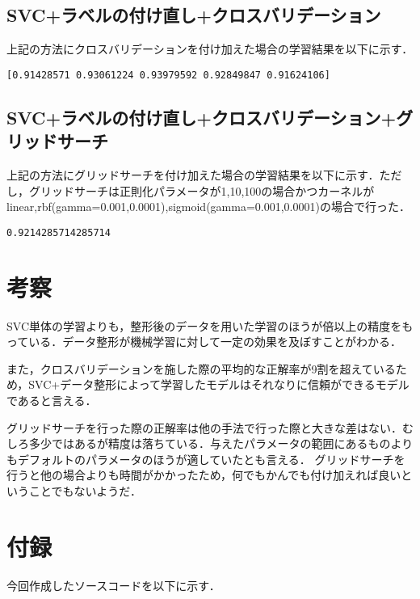 \documentclass[a4paper, titlepage]{jsarticle}
\begin{document}
	\subsection{SVC+ラベルの付け直し+クロスバリデーション}
	上記の方法にクロスバリデーションを付け加えた場合の学習結果を以下に示す．

	\begin{lstlisting}
[0.91428571 0.93061224 0.93979592 0.92849847 0.91624106]
	\end{lstlisting}

	\subsection{SVC+ラベルの付け直し+クロスバリデーション+グリッドサーチ}
	上記の方法にグリッドサーチを付け加えた場合の学習結果を以下に示す．ただし，グリッドサーチは正則化パラメータが1,10,100の場合かつカーネルがlinear,rbf(gamma=0.001,0.0001),sigmoid(gamma=0.001,0.0001)の場合で行った．

	\begin{lstlisting}
0.9214285714285714
	\end{lstlisting}

	\section{考察}
	SVC単体の学習よりも，整形後のデータを用いた学習のほうが倍以上の精度をもっている．データ整形が機械学習に対して一定の効果を及ぼすことがわかる．
	
	また，クロスバリデーションを施した際の平均的な正解率が9割を超えているため，SVC+データ整形によって学習したモデルはそれなりに信頼ができるモデルであると言える．

	グリッドサーチを行った際の正解率は他の手法で行った際と大きな差はない．むしろ多少ではあるが精度は落ちている．与えたパラメータの範囲にあるものよりもデフォルトのパラメータのほうが適していたとも言える．
	グリッドサーチを行うと他の場合よりも時間がかかったため，何でもかんでも付け加えれば良いということでもないようだ．

	\section{付録}
	今回作成したソースコードを以下に示す．
\end{document}
